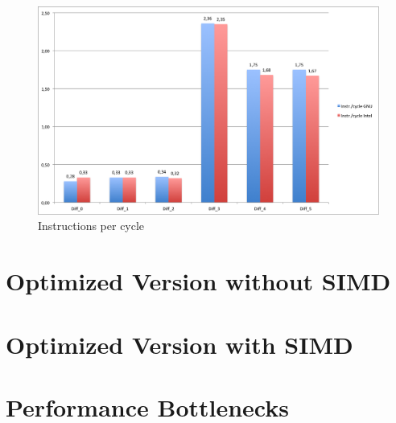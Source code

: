 \documentclass[12pt,a4paper]{article}
\begin{document}
\begin{figure}
	\centering
	\includegraphics[width=1.0\linewidth]{"Benchmark/Instrcycle"}
	\caption{Instructions per cycle}
	\label{fig:instrcycle}
\end{figure}


\section{Optimized Version without SIMD}
\section{Optimized Version with SIMD}
\section{Performance Bottlenecks}
\end{document}
